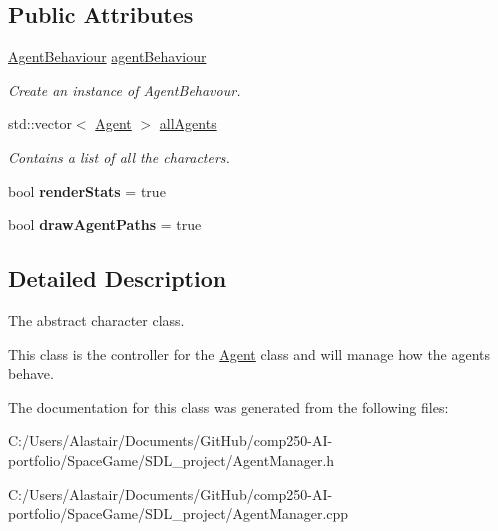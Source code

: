 \subsection*{Public Attributes}
\begin{DoxyCompactItemize}
\item 
\mbox{\label{class_agent_manager_ac83790e3aa445b1c1547d4c9a9016cb2}} 
\hyperlink{class_agent_behaviour}{Agent\+Behaviour} \hyperlink{class_agent_manager_ac83790e3aa445b1c1547d4c9a9016cb2}{agent\+Behaviour}
\begin{DoxyCompactList}\small\item\em Create an instance of Agent\+Behavour. \end{DoxyCompactList}\item 
\mbox{\label{class_agent_manager_a599aa8ac7b9ac078c77b493278d2b6da}} 
std\+::vector$<$ \hyperlink{class_agent}{Agent} $>$ \hyperlink{class_agent_manager_a599aa8ac7b9ac078c77b493278d2b6da}{all\+Agents}
\begin{DoxyCompactList}\small\item\em Contains a list of all the characters. \end{DoxyCompactList}\item 
\mbox{\label{class_agent_manager_a7d43712823386d03a70dede42b1358e2}} 
bool {\bfseries render\+Stats} = true
\item 
\mbox{\label{class_agent_manager_a6b8f87746c5ff0deef91b13e5d1983c6}} 
bool {\bfseries draw\+Agent\+Paths} = true
\end{DoxyCompactItemize}


\subsection{Detailed Description}
The abstract character class. 

This class is the controller for the \hyperlink{class_agent}{Agent} class and will manage how the agents behave. 

The documentation for this class was generated from the following files\+:\begin{DoxyCompactItemize}
\item 
C\+:/\+Users/\+Alastair/\+Documents/\+Git\+Hub/comp250-\/\+A\+I-\/portfolio/\+Space\+Game/\+S\+D\+L\+\_\+project/Agent\+Manager.\+h\item 
C\+:/\+Users/\+Alastair/\+Documents/\+Git\+Hub/comp250-\/\+A\+I-\/portfolio/\+Space\+Game/\+S\+D\+L\+\_\+project/Agent\+Manager.\+cpp\end{DoxyCompactItemize}
